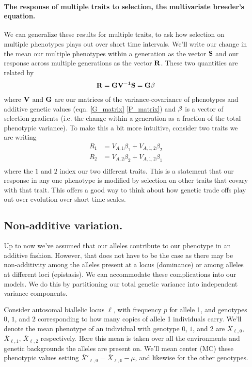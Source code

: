 \paragraph{The response of multiple traits to selection, the
  multivariate breeder's equation.}
We can generalize these results for multiple traits, to ask how selection on
multiple phenotypes plays out over short time intervals. We'll write
our change in the mean our multiple phenotypes within a generation as
the vector $\bf{S}$ and our response across multiple generations as
the vector $\bf{R}$. These two quantities are related by 
\begin{equation}
\bf{R} = \bf{G} \bf{V}^{-1} \bf{S} = \bf{G} \bf{\beta}
\end{equation}
 where $\bf{V}$ and $\bf{G}$ are our matrices of the
 variance-covariance of phenotypes and additive genetic values
 (eqn. \eqref{G_matrix} \eqref{P_matrix}) and
 $\bf{\beta}$ is a vector of selection gradients (i.e. the change
 within a generation as a fraction of the total phenotypic variance).
To make this a bit more intuitive, consider two traits we are writing 
\begin{eqnarray}
R_1 & = V_{A,1} \beta_1 + V_{A,1,2} \beta_2 \nonumber \\
R_2 & = V_{A,2} \beta_2 + V_{A,1,2} \beta_1  \nonumber \\
\end{eqnarray}
where the $1$ and $2$ index our two different traits. This is a
statement that our response in any one phenotype is modified by
selection on other traits that covary with that trait.
This offers a good way to think about how genetic trade offs play out
over evolution over short time-scales.

\newpage
\subsection{Non-additive variation.}

Up to now we've assumed that our alleles contribute to our phenotype in an
additive fashion. However, that does not have to be the case as there may be
non-additivity among the alleles present at a locus (dominance) or among
alleles at different loci (epistasis). We can accommodate these complications
into our models. We do this by partitioning our total genetic variance into
independent variance components.

Consider autosomal biallelic locus $\ell$, with frequency $p$ for allele 1, and
genotypes $0$, $1$, and $2$ corresponding to how many copies of allele
1 individuals carry. We'll denote the mean phenotype of an individual
with genotype $0$, $1$, and $2$ are $\overline{X}_{\ell,0}$,
$\overline{X}_{\ell,1}$, $\overline{X}_{\ell,2}$ respectively. Here this mean is
taken over all the environments and genetic backgrounds the alleles
are present on. We'll mean center (MC)
these phenotypic values setting $\overline{X}'_{\ell,0} = \overline{X}_{\ell,0} - \mu$, and
likewise for the other genotypes. 

